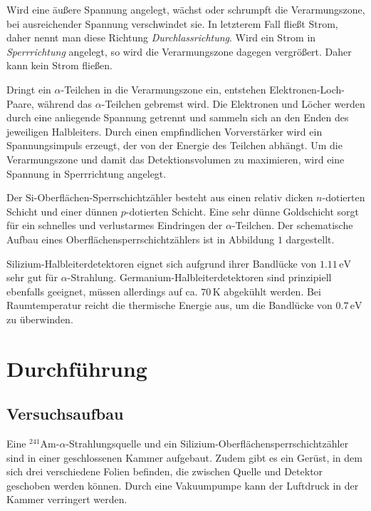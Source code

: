 \documentclass[12pt,a4paper]{scrartcl}
\numberwithin{equation}{section} %
\begin{document}
Wird eine äußere Spannung angelegt, wächst oder schrumpft die Verarmungszone, bei ausreichender Spannung verschwindet sie. In letzterem Fall fließt Strom, daher nennt man diese Richtung \emph{Durchlassrichtung}. Wird ein Strom in \emph{Sperrrichtung} angelegt, so wird die Verarmungszone dagegen vergrößert. Daher kann kein Strom fließen.

Dringt ein $\alpha$-Teilchen in die Verarmungszone ein, entstehen Elektronen-Loch-Paare, während das $\alpha$-Teilchen gebremst wird. Die Elektronen und Löcher werden durch eine anliegende Spannung getrennt und sammeln sich an den Enden des jeweiligen Halbleiters. Durch einen empfindlichen Vorverstärker wird ein Spannungsimpuls erzeugt, der von der Energie des Teilchen abhängt. Um die Verarmungszone und damit das Detektionsvolumen zu maximieren, wird eine Spannung in Sperrrichtung angelegt.

Der $\mathrm{Si}$-Oberflächen-Sperrschichtzähler besteht aus einen relativ dicken $n$-dotierten Schicht und einer dünnen $p$-dotierten Schicht. Eine sehr dünne Goldschicht sorgt für ein schnelles und verlustarmes Eindringen der $\alpha$-Teilchen. Der schematische Aufbau eines Oberflächensperrschichtzählers ist in Abbildung $1$ dargestellt.

Silizium-Halbleiterdetektoren eignet sich aufgrund ihrer Bandlücke von $1.11\mathrm{\,eV}$ sehr gut für $\alpha$-Strahlung. Germanium-Halbleiterdetektoren sind prinzipiell ebenfalls geeignet, müssen allerdings auf ca. $70\,\mathrm K$ abgekühlt werden. Bei Raumtemperatur reicht die thermische Energie aus, um die Bandlücke von $0.7\mathrm{\,eV}$ zu überwinden. \cite{Knoll}

\hypertarget{durchfuxfchrung}{%
\section{Durchführung}\label{durchfuxfchrung}}

\hypertarget{versuchsaufbau}{%
\subsection{Versuchsaufbau}\label{versuchsaufbau}}

Eine $^{241}\mathrm{Am}$-$\alpha$-Strahlungsquelle und ein Silizium-Oberflächensperrschichtzähler sind in einer geschlossenen Kammer aufgebaut. Zudem gibt es ein Gerüst, in dem sich drei verschiedene Folien befinden, die zwischen Quelle und Detektor geschoben werden können. Durch eine Vakuumpumpe kann der Luftdruck in der Kammer verringert werden.
\end{document}
